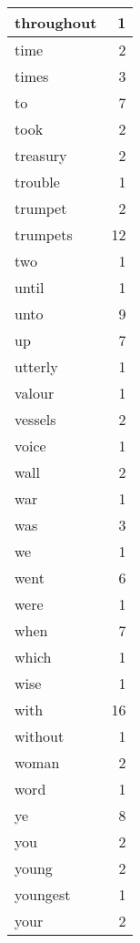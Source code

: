 \begin{center}
\begin{longtable}{l|r}
throughout & 1 \\ \hline
time & 2 \\ \hline
times & 3 \\ \hline
to & 7 \\ \hline
took & 2 \\ \hline
treasury & 2 \\ \hline
trouble & 1 \\ \hline
trumpet & 2 \\ \hline
trumpets & 12 \\ \hline
two & 1 \\ \hline
until & 1 \\ \hline
unto & 9 \\ \hline
up & 7 \\ \hline
utterly & 1 \\ \hline
valour & 1 \\ \hline
vessels & 2 \\ \hline
voice & 1 \\ \hline
wall & 2 \\ \hline
war & 1 \\ \hline
was & 3 \\ \hline
we & 1 \\ \hline
went & 6 \\ \hline
were & 1 \\ \hline
when & 7 \\ \hline
which & 1 \\ \hline
wise & 1 \\ \hline
with & 16 \\ \hline
without & 1 \\ \hline
woman & 2 \\ \hline
word & 1 \\ \hline
ye & 8 \\ \hline
you & 2 \\ \hline
young & 2 \\ \hline
youngest & 1 \\ \hline
your & 2 \\ \hline
\end{longtable}
\end{center}



\normalsize



